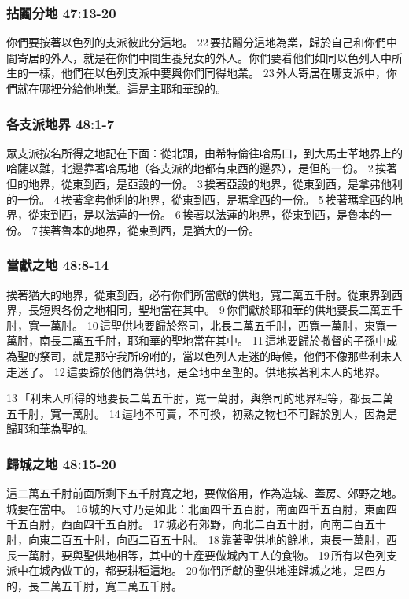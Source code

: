 \subsubsection{拈鬮分地 47:13-20}
你們要按著以色列的支派彼此分這地。 22 要拈鬮分這地為業，歸於自己和你們中間寄居的外人，就是在你們中間生養兒女的外人。你們要看他們如同以色列人中所生的一樣，他們在以色列支派中要與你們同得地業。 23 外人寄居在哪支派中，你們就在哪裡分給他地業。這是主耶和華說的。


\subsubsection{各支派地界 48:1-7}
眾支派按名所得之地記在下面：從北頭，由希特倫往哈馬口，到大馬士革地界上的哈薩以難，北邊靠著哈馬地（各支派的地都有東西的邊界），是但的一份。 2 挨著但的地界，從東到西，是亞設的一份。 3 挨著亞設的地界，從東到西，是拿弗他利的一份。 4 挨著拿弗他利的地界，從東到西，是瑪拿西的一份。 5 挨著瑪拿西的地界，從東到西，是以法蓮的一份。 6 挨著以法蓮的地界，從東到西，是魯本的一份。 7 挨著魯本的地界，從東到西，是猶大的一份。

\subsubsection{當獻之地 48:8-14}
挨著猶大的地界，從東到西，必有你們所當獻的供地，寬二萬五千肘。從東界到西界，長短與各份之地相同，聖地當在其中。 9 你們獻於耶和華的供地要長二萬五千肘，寬一萬肘。 10 這聖供地要歸於祭司，北長二萬五千肘，西寬一萬肘，東寬一萬肘，南長二萬五千肘，耶和華的聖地當在其中。 11 這地要歸於撒督的子孫中成為聖的祭司，就是那守我所吩咐的，當以色列人走迷的時候，他們不像那些利未人走迷了。 12 這要歸於他們為供地，是全地中至聖的。供地挨著利未人的地界。

13 「利未人所得的地要長二萬五千肘，寬一萬肘，與祭司的地界相等，都長二萬五千肘，寬一萬肘。 14 這地不可賣，不可換，初熟之物也不可歸於別人，因為是歸耶和華為聖的。

\subsubsection{歸城之地 48:15-20}
這二萬五千肘前面所剩下五千肘寬之地，要做俗用，作為造城、蓋房、郊野之地。城要在當中。 16 城的尺寸乃是如此：北面四千五百肘，南面四千五百肘，東面四千五百肘，西面四千五百肘。 17 城必有郊野，向北二百五十肘，向南二百五十肘，向東二百五十肘，向西二百五十肘。 18 靠著聖供地的餘地，東長一萬肘，西長一萬肘，要與聖供地相等，其中的土產要做城內工人的食物。 19 所有以色列支派中在城內做工的，都要耕種這地。 20 你們所獻的聖供地連歸城之地，是四方的，長二萬五千肘，寬二萬五千肘。

